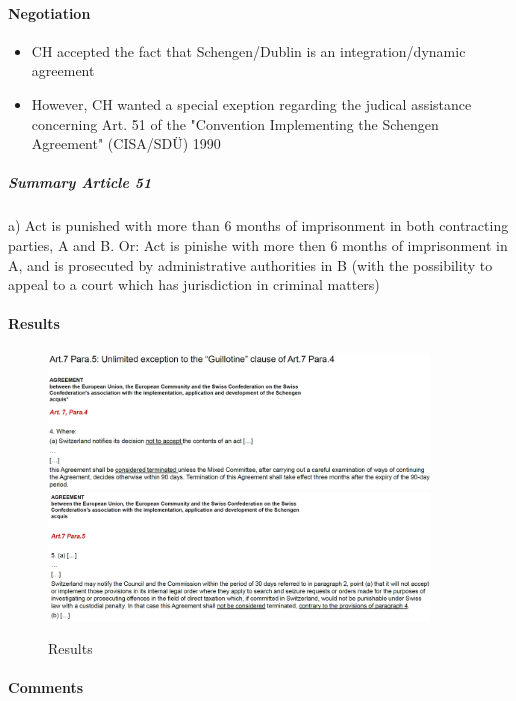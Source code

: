 \paragraph{Negotiation}

\begin{itemize}
    \item CH accepted the fact that Schengen/Dublin is an integration/dynamic agreement
    \item However, CH wanted a special exeption regarding the judical assistance
        concerning Art. 51 of the "Convention Implementing the Schengen
        Agreement" (CISA/SDÜ) 1990
\end{itemize}

\subparagraph{Summary Article 51}

a)
Act is punished with more than 6 months of imprisonment in both contracting
parties, A and B. Or: Act is pinishe with more then 6 months of imprisonment
in A, and is prosecuted by administrative authorities in B (with the
possibility to appeal to a court which has jurisdiction in criminal matters)

\paragraph{Results}

\begin{figure}[H]
    \centering
    \includegraphics[width=0.9\textwidth]{Pictures/Schengen_result_1.png}
    \includegraphics[width=0.9\textwidth]{Pictures/Schengen_result_2.png}
    \caption{Results}
\end{figure}


\paragraph{Comments}

